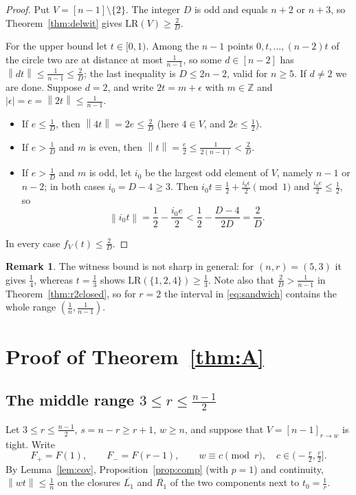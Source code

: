 \documentclass[11pt]{article}
\theoremstyle{definition}
\newtheorem{remark}[theorem]{Remark}
\newcommand{\LR}{\mathrm{LR}}
\newcommand{\Z}{\mathbb{Z}}
\newcommand{\norm}[1]{\left\lVert #1 \right\rVert}
\begin{document}
\begin{proof}
Put $V=[n-1]\setminus\{2\}$. The integer $D$ is odd and equals $n+2$ or
$n+3$, so Theorem~\ref{thm:delwit} gives $\LR(V)\ge\frac2D$.

For the upper bound let $t\in[0,1)$. Among the $n-1$ points
$0,t,\dots,(n-2)t$ of the circle two are at distance at most
$\frac1{n-1}$, so some $d\in[n-2]$ has
$\norm{dt}\le\frac1{n-1}\le\frac2D$; the last inequality is
$D\le2n-2$, valid for $n\ge5$. If $d\ne2$ we are done. Suppose
$d=2$, and write $2t=m+\epsilon$ with $m\in\Z$ and
$\lvert\epsilon\rvert=e=\norm{2t}\le\frac1{n-1}$.
\begin{itemize}
\item If $e\le\frac1D$, then $\norm{4t}=2e\le\frac2D$ (here $4\in V$,
and $2e\le\frac12$).
\item If $e>\frac1D$ and $m$ is even, then
$\norm{t}=\frac e2\le\frac1{2(n-1)}<\frac2D$.
\item If $e>\frac1D$ and $m$ is odd, let $i_0$ be the largest odd
element of $V$, namely $n-1$ or $n-2$; in both cases $i_0=D-4\ge3$.
Then $i_0t\equiv\frac12+\frac{i_0\epsilon}2\pmod1$ and
$\frac{i_0e}2\le\frac12$, so
\[
\norm{i_0t}=\frac12-\frac{i_0e}2<\frac12-\frac{D-4}{2D}=\frac2D .
\]
\end{itemize}
In every case $f_V(t)\le\frac2D$.
\end{proof}

\begin{remark}
The witness bound is not sharp in general: for $(n,r)=(5,3)$ it gives
$\frac14$, whereas $t=\frac13$ shows $\LR(\{1,2,4\})\ge\frac13$. Note
also that $\frac2D>\frac1{n-1}$ in Theorem~\ref{thm:r2closed}, so for
$r=2$ the interval in \eqref{eq:sandwich} contains the whole range
$(\frac1n,\frac1{n-1})$.
\end{remark}

\section{Proof of Theorem~\ref{thm:A}}\label{sec:thmA}

\subsection{\texorpdfstring{The middle range $3\le r\le\frac{n-1}2$}{The middle range 3 <= r <= (n-1)/2}}

Let $3\le r\le\frac{n-1}2$, $s=n-r\ge r+1$, $w\ge n$, and suppose that
$V=[n-1]_{r\to w}$ is tight. Write
\[
F_+=F(1),\qquad F_-=F(r-1),\qquad w\equiv c\pmod r,\quad
c\in\bigl(-\tfrac r2,\tfrac r2\bigr].
\]
By Lemma~\ref{lem:cov}, Proposition~\ref{prop:comp} (with $p=1$) and
continuity, $\norm{wt}\le\frac1n$ on the closures $\overline{L_1}$ and
$\overline{R_1}$ of the two components next to $t_0=\frac1r$.
\end{document}
